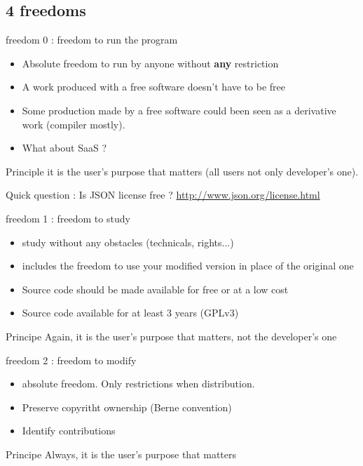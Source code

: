 \documentclass{beamer}
\begin{document}

\subsection{4 freedoms}


\begin{frame}{freedom 0 : freedom to run the program}
  \begin{itemize}
  \item Absolute freedom to run by anyone without \textbf{any} restriction
  \item A work produced with a free software doesn't have to be free
  \item Some production made by a free software could been seen as a derivative work (compiler mostly).
  \item What about SaaS ?
  \end{itemize}

  \begin{alertblock}{Principle}
     it is the user's purpose that matters (all users not only developer's one).
  \end{alertblock}
  
  Quick question : Is JSON license free ? \url{http://www.json.org/license.html}

\end{frame}


\begin{frame}{freedom 1 : freedom to study}
  \begin{itemize}
  \item study without any obstacles (technicals, rights...)
  \item includes the freedom to use your modified version in place of the original one
  \item Source code should be made available for free or at a low cost
  \item Source code available for at least 3 years (GPLv3)
  \end{itemize}
  \begin{alertblock}{Principe}
    Again, it is the user's purpose that matters, not the developer's one
  \end{alertblock}
\end{frame}


\begin{frame}{freedom 2 : freedom to modify}
  \begin{itemize}
  \item absolute freedom. Only restrictions when distribution.
  \item Preserve copyritht ownership (Berne convention)
  \item Identify  contributions
  \end{itemize}
\begin{alertblock}{Principe}
    Always, it is the user's purpose that matters
  \end{alertblock}
\end{frame}
\end{document}
